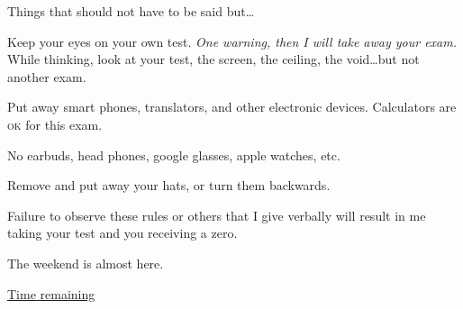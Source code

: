 \documentclass[t]{beamer}
\begin{document}
\begin{frame}[t]{Things that should not have to be said but\dots}
	
	\vspace*{-\baselineskip}
	\hangpara Keep your eyes on your own test. \textit{One warning, then I will take away your exam.} While thinking, look at your test, the screen, the ceiling, the void\dots but not another exam.
	
	\hangpara Put away smart phones, translators, and other electronic devices. Calculators are \textsc{ok} for this exam. 
	
	\hangpara No earbuds, head phones, google glasses, apple watches, etc.
	
	\hangpara Remove and put away your hats, or turn them backwards. 
	
	\hangpara Failure to observe these rules or others that I give verbally will result in me taking your test and you receiving a zero.
	
	\hangpara {} The weekend is almost here.
	
	\vfilll
	
	\hfill \tiny \href{https://www.timeanddate.com/worldclock/usa/chicago}{Time remaining}
	
\end{frame}

%
\end{document}
